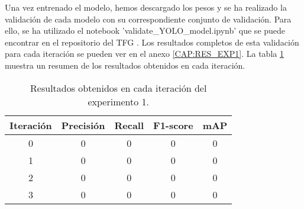 Una vez entrenado el modelo, hemos descargado los pesos y se ha realizado la validación de cada modelo con su correspondiente conjunto de validación. Para ello, se ha utilizado el notebook 'validate\_YOLO\_model.ipynb' que se puede encontrar en el repositorio del TFG \cite{TFG_Repository}. Los resultados completos de esta validación para cada iteración se pueden ver en el anexo \ref{CAP:RES_EXP1}. La tabla \ref{tab:exp1_results} muestra un resumen de los resultados obtenidos en cada iteración.

\begin{table}[H]
    \centering
    \begin{tabular}{|c|c|c|c|c|}
        \hline
        \textbf{Iteración} & \textbf{Precisión} & \textbf{Recall} & \textbf{F1-score} & \textbf{mAP} \\ \hline
        0 & 0 & 0 & 0 & 0 \\ \hline
        1 & 0 & 0 & 0 & 0 \\ \hline
        2 & 0 & 0 & 0 & 0 \\ \hline
        3 & 0 & 0 & 0 & 0 \\ \hline
    \end{tabular}
    \caption{Resultados obtenidos en cada iteración del experimento 1.}
    \label{tab:exp1_results}
\end{table}

